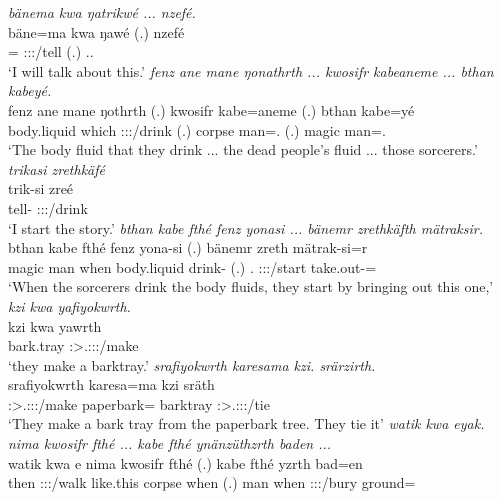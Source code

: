 \clearpage
\begin{exe}
	\emph{bänema kwa ŋatrikwé ... nzefé.}\\
	\gll bäne=ma kwa ŋawé (.) nzefé\\
	\Recog={\Char} {\Fut} \Fsg:\Sbj:\Nonpast:\Ipfv/tell (.) \Fsg.\Erg.\Emph\\
	\trans `I will talk about this.'
	\emph{fenz ane mane ŋonathrth ... kwosifr kabeaneme ... bthan kabeyé.}\\
	\gll fenz ane mane ŋothrth (.) kwosifr kabe=aneme (.) bthan kabe=yé\\
	body.liquid {\Dem} which \Stpl:\Sbj:\Nonpast:\Ipfv/drink (.) corpse man=\Poss.{\Nsg} (.) magic man=\Erg.\Nsg\\
	\trans `The body fluid that they drink ... the dead people's fluid ... those sorcerers.'
	\emph{trikasi zrethkäfé}\\
	\gll trik-si zreé\\
	tell-{\Nmlz} \Stpl:\Sbj:\Irr:\Pfv/drink\\
	\trans `I start the story.'
	\emph{bthan kabe fthé fenz yonasi ... bänemr zrethkäfth mätraksir.}\\
	\gll bthan kabe fthé fenz yona-si (.) bänemr zreth mätrak-si=r\\
	magic man when body.liquid drink-{\Nmlz} (.) \Recog.{\Purp} \Stpl:\Sbj:\Irr:\Pfv/start take.out-\Nmlz=\Purp\\
	\trans `When the sorcerers drink the body fluids, they start by bringing out this one,'
	\emph{kzi kwa yafiyokwrth.}\\
	\gll kzi kwa yawrth\\
	bark.tray {\Fut} \Stpl:\Sbj>\Tsg.\Masc:\Obj:\Nonpast:\Ipfv/make\\
	\trans `they make a barktray.'
	\emph{srafiyokwrth karesama kzi. srärzirth.}\\
	\gll srafiyokwrth karesa=ma kzi sräth\\
	\Stpl:\Sbj>\Tsg.\Masc:\Obj:\Irr:\Ipfv/make paperbark={\Char} barktray \Stpl:\Sbj>\Tsg.\Masc:\Obj:\Irr:\Pfv/tie\\
	\trans `They make a bark tray from the paperbark tree. They tie it'
	\emph{watik kwa eyak. nima kwosifr fthé ... kabe fthé ynänzüthzrth baden ...}\\
	\gll watik kwa e nima kwosifr fthé (.) kabe fthé yzrth bad=en\\
	then {\Fut} \Stpl:\Sbj:\Nonpast:\Ipfv/walk like.this corpse when (.) man when \Stpl:\Sbj:\Nonpast:\Ipfv/bury ground=\Loc\\

\end{exe}
